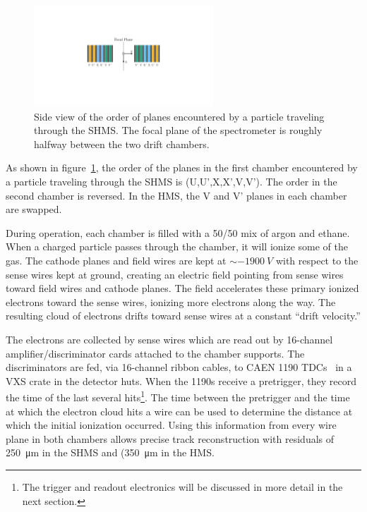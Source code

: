 \begin{figure}[!h]
    \centering
    \includegraphics[width=0.6\textwidth]{chap3/dc_plane_order.pdf}
    \caption{Side view of the order of planes encountered by a particle
             traveling through the SHMS. The focal plane of the spectrometer
             is roughly halfway between the two drift chambers.}
    \label{fig:shms_plane_order}
\end{figure}

As shown in figure~\ref{fig:shms_plane_order}, the order of the planes in the
first chamber encountered by a particle traveling through the SHMS is
(U,U',X,X',V,V').
The order in the second chamber is reversed.
In the HMS, the V and V' planes in each chamber are swapped.

During operation, each chamber is filled with a 50/50 mix of argon and ethane.
When a charged particle passes through the chamber, it will ionize some of
the gas.
The cathode planes and field wires are kept at $\sim-\SI{1900}{V}$ with respect
to the sense wires kept at ground, creating an electric field pointing from
sense wires toward field wires and cathode planes.
The field accelerates these primary ionized electrons toward the sense wires,
ionizing more electrons along the way.
The resulting cloud of electrons drifts toward sense wires at a
constant ``drift velocity.''

The electrons are collected by sense wires which are read out by 16-channel
amplifier/discriminator cards attached to the chamber supports.
The discriminators are fed, via 16-channel ribbon cables, to CAEN 1190
TDCs~\cite{CAEN_1190_manual} in a VXS crate in the detector huts.
When the 1190s receive a pretrigger, they record the time of the last several
hits\footnote{The trigger and readout electronics will be discussed in more
detail in the next section.}.
The time between the pretrigger and the time at which the electron cloud hits
a wire can be used to determine the distance at which the initial ionization
occurred.
Using this information from every wire plane in both chambers allows
precise track reconstruction with residuals of \SI{250}{\micro\meter} in the
SHMS and (\SI{350}{\micro\meter} in the HMS.

